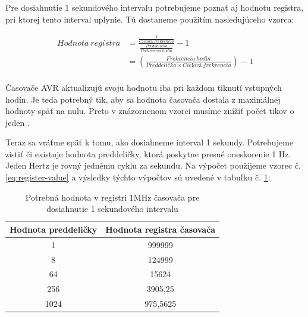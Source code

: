 Pre dosiahnutie 1 sekundového intervalu potrebujeme poznať aj hodnotu registra,
pri ktorej tento interval uplynie. Tú dostaneme použitím nasledujúceho vzorca:

\begin{equation} \label{eq:register-value}
    \begin{aligned}
        Hodnota\:registra & = \frac{ \frac{1}{Cieľová\:frekvencia}} { \frac{Preddelička}{Frekvencia\:hodín}} - 1 \\
                          & = (\frac{Frekvencia\:hodín}{Preddelička \times Cieľová\:frekvencia}) - 1             \\
    \end{aligned}
\end{equation}

Časovače AVR aktualizujú svoju hodnotu iba pri každom tiknutí vstupných hodín.
Je teda potrebný tik, aby sa hodnota časovača dostala z maximálnej hodnoty späť na nulu. Preto v znázornenom vzorci
musíme znížiť počet tikov o jeden \cite{atmelATmega64012801281}. \par

Teraz sa vráťme späť k tomu, ako dosiahneme interval 1 sekundy.
Potrebujeme zistiť či existuje hodnota preddeličky, ktorá poskytne presné oneskorenie 1 \acrshort{Hz}. Jeden Hertz je rovný jednému cyklu za sekundu. Na výpočet použijeme vzorec
č.\ref{eq:register-value} a výsledky týchto výpočtov sú uvedené v tabuľku č. \ref{table:timerPrescalerValues}:

\begin{table}[!htbp]
    \begin{center}
        \begin{tabular}{|c|c|}
            \hline
            Hodnota preddeličky & Hodnota registra časovača \\
            \hline
            1                   & 999999                    \\
            8                   & 124999                    \\
            64                  & 15624                     \\
            256                 & 3905,25                   \\
            1024                & 975,5625                  \\
            \hline
        \end{tabular}
        \caption{Potrebná hodnota v registri 1MHz časovača pre dosiahnutie 1 sekundového intervalu}
        \label{table:timerPrescalerValues}
    \end{center}
\end{table}

